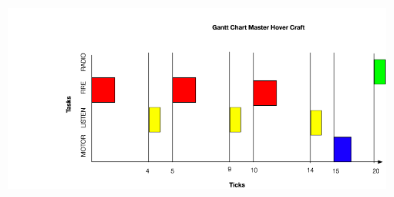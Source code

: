 \begin{minipage}{6.5in}
        \centering
        \includegraphics[width = 100mm]{imageSources/Gantt.png}
        \label{gantt}
\end{minipage}
